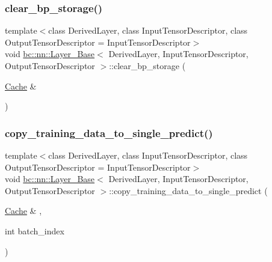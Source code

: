 \subsubsection{\texorpdfstring{clear\+\_\+bp\+\_\+storage()}{clear\_bp\_storage()}}
{\footnotesize\ttfamily template$<$class Derived\+Layer, class Input\+Tensor\+Descriptor, class Output\+Tensor\+Descriptor = Input\+Tensor\+Descriptor$>$ \\
void \hyperlink{structbc_1_1nn_1_1Layer__Base}{bc\+::nn\+::\+Layer\+\_\+\+Base}$<$ Derived\+Layer, Input\+Tensor\+Descriptor, Output\+Tensor\+Descriptor $>$\+::clear\+\_\+bp\+\_\+storage (\begin{DoxyParamCaption}\item[{\hyperlink{structbc_1_1nn_1_1Cache}{Cache} \&}]{ }\end{DoxyParamCaption})\hspace{0.3cm}{\ttfamily [inline]}}

\mbox{\label{structbc_1_1nn_1_1Layer__Base_a2c4d5de71c469f678f929a9c02ee32a2}} 
\subsubsection{\texorpdfstring{copy\+\_\+training\+\_\+data\+\_\+to\+\_\+single\+\_\+predict()}{copy\_training\_data\_to\_single\_predict()}}
{\footnotesize\ttfamily template$<$class Derived\+Layer, class Input\+Tensor\+Descriptor, class Output\+Tensor\+Descriptor = Input\+Tensor\+Descriptor$>$ \\
void \hyperlink{structbc_1_1nn_1_1Layer__Base}{bc\+::nn\+::\+Layer\+\_\+\+Base}$<$ Derived\+Layer, Input\+Tensor\+Descriptor, Output\+Tensor\+Descriptor $>$\+::copy\+\_\+training\+\_\+data\+\_\+to\+\_\+single\+\_\+predict (\begin{DoxyParamCaption}\item[{\hyperlink{structbc_1_1nn_1_1Cache}{Cache} \&}]{,  }\item[{int}]{batch\+\_\+index }\end{DoxyParamCaption})\hspace{0.3cm}{\ttfamily [inline]}}

